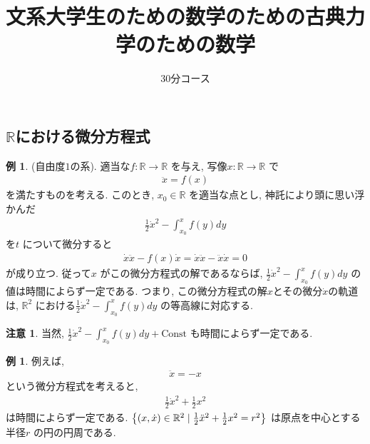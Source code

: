 \documentclass[10pt, fleqn, label-section=none]{bxjsarticle}
\title{文系大学生のための数学のための古典力学のための数学}
\date{}
\author{30分コース}
\theoremstyle{definition}
\newtheorem{ex}[dfn]{例}
\newtheorem{remark}[dfn]{注意}
\newcommand{\cbra}[1]{\mleft\{#1\mright\}}
\newcommand{\Const}{\textrm{Const}}
\renewcommand{\;}{\, ; \,}
\begin{document}
\maketitle



\section{}

\subsection{$\mathbb R$における微分方程式}


\begin{ex}(自由度$1$の系). 適当な$f: \mathbb R \rightarrow \mathbb R$ を与え, 写像$x: \mathbb R \rightarrow \mathbb R$ で
\begin{align*} \ddot x = f(x)  \end{align*}
を満たすものを考える. このとき, $x_0 \in \mathbb R$ を適当な点とし, 神託により頭に思い浮かんだ
\begin{align*} \frac{1}{2} \dot{x} ^2 - \int_{x_0}^x f(y) dy \end{align*}
を$t$ について微分すると
\begin{align*} \dot x \ddot x - f(x) \dot x = \dot x \ddot x- \ddot x \dot x = 0\end{align*} 
が成り立つ. 従って$x$ がこの微分方程式の解であるならば, $\frac{1}{2} \dot{x} ^2 - \int_{x_0}^x f(y) dy $ の値は時間によらず一定である. つまり, この微分方程式の解$x$とその微分$\dot x$の軌道は, $\mathbb R^2$ における$\frac{1}{2} \dot{x} ^2 - \int_{x_0}^x f(y) dy $ の等高線に対応する. 
\end{ex}

\begin{remark}
当然, $\frac{1}{2} \dot{x} ^2 - \int_{x_0}^x f(y) dy + \Const$ も時間によらず一定である.  
\end{remark}


\begin{ex} 例えば, 
\begin{align*} \ddot x = -x \end{align*}
という微分方程式を考えると, 
\begin{align*} \frac{1}{2} \dot {x} ^2 + \frac{1}{2} x^2 \end{align*}
は時間によらず一定である. $\cbra{(x, \dot x) \in \mathbb R^2 \mid  \frac{1}{2} \ddot {x} ^2 + \frac{1}{2} x^2 = r^2 }$ は原点を中心とする半径$r$ の円の円周である.  
\end{ex}
\end{document}
